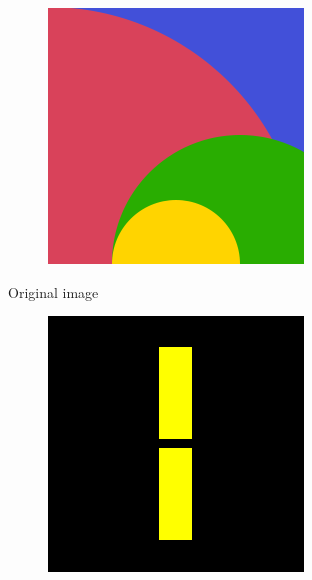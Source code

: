 \documentclass[xcolor=dvipsnames, xetex,serif]{beamer}
\begin{document}
\begin{frame}
\begin{figure}[H]
\begin{subfigure}{0.15\linewidth}
            \end{subfigure}
            \begin{subfigure}{0.15\linewidth}
                \centering
                \includegraphics[width=0.9\linewidth]{images/image_inpaint_synthetic/case05-original.png}	
            \end{subfigure}
            \caption{Original image}
        \end{figure}
        \begin{figure}[H]
            \centering
            \begin{subfigure}{0.15\linewidth}
                \centering
                \includegraphics[width=0.9\linewidth]{images/image_inpaint_synthetic/case01-toinpaint.png}

\end{subfigure}
\end{figure}
\end{frame}
\end{document}
